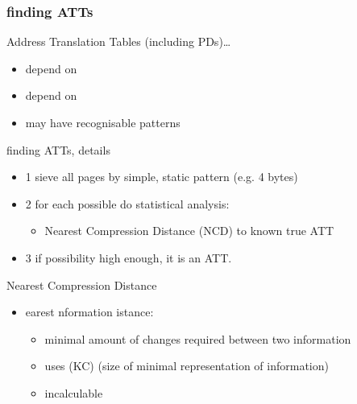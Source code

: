 \documentclass{beamer}
\newenvironment{itemizeframe}[1]
  {\begin{frame}{#1}\startitemizeframe}
  {\stopitemizeframe\end{frame}}
\newcommand\startitemizeframe{\begin{itemize}}
\newcommand\stopitemizeframe{\end{itemize}}
\begin{document}
		\begin{frame} \frametitle{finding ATTs}
			Address Translation Tables (including PDs)\ldots
			\begin{itemize}
				\item depend on 
				\item depend on 
				\item may have recognisable patterns
			\end{itemize}
		\end{frame}

		\begin{itemizeframe}{finding ATTs, details}
			\item[1] sieve all pages by simple, static pattern (e.g. 4 bytes)
			\item[2] for each possible do statistical analysis:
			\begin{itemize}
				\item Nearest Compression Distance (NCD) to known true ATT
			\end{itemize}
			\item[3] if possibility high enough, it is an ATT.
		\end{itemizeframe}

		\begin{itemizeframe}{Nearest Compression Distance}
			\item {}earest nformation istance:
			\begin{itemize}
				\item minimal amount of changes required between two information
				\item uses  (KC) (size of minimal representation of information)
				\item incalculable
			\end{itemize}
		\end{itemizeframe}
\end{document}
